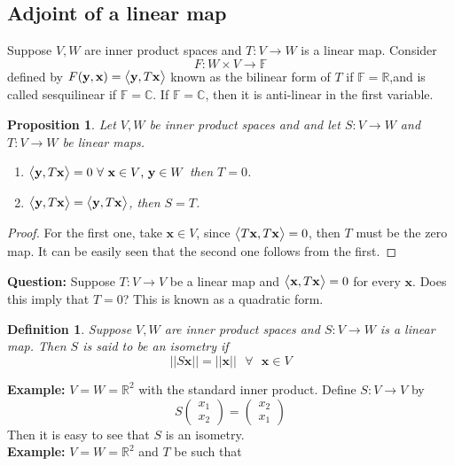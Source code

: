 \documentclass{article}
\newtheorem{definition}{Definition}
\newtheorem{proposition}{Proposition}
\begin{document}
\subsection*{Adjoint of a linear map}
Suppose $V,W$ are inner product spaces and $T:V\to W$ is a linear map. Consider 
$$F:W\times V\to \mathbb{F}$$
defined by $F(\mathbf{y},\mathbf{x})=\big{<}\mathbf{y},T\mathbf{x}\big{>}$ known as the bilinear form of  $T$ if $\mathbb{F}=\mathbb{R}$,and is called sesquilinear if $\mathbb{F}=\mathbb{C}$.
If $\mathbb{F}=\mathbb{C}$, then it is anti-linear in the first variable.
\begin{proposition}
    Let $V,W$ be inner product spaces and and let $S:V\to W$ and $T:V\to W$ be linear maps.
    \begin{enumerate}
        \item $\big{<}\mathbf{y},T\mathbf{x}\big{>}=0\text{ }\forall \text{ }\mathbf{x}\in V\text{, }\mathbf{y}\in W$ then $T=0$.
        \item $\big{<}\mathbf{y},T\mathbf{x}\big{>}=\big{<}\mathbf{y},T\mathbf{x}\big{>}$, then $S=T$.
    \end{enumerate}
\end{proposition}
    \begin{proof}
        For the first one, take $\mathbf{x}\in V$, since $\big{<}T\mathbf{x},T\mathbf{x}\big{>}=0$, then $T$ must be the zero map. It can be easily seen that the second one follows from the first.
    \end{proof}
\textbf{Question:} Suppose $T:V\to V$ be a linear map and $\big{<}\mathbf{x},T\mathbf{x}\big{>}=0$ for every $\mathbf{x}$. Does this imply that $T=0$? This is known as a quadratic form.
\\
\begin{definition}
    Suppose $V,W$ are inner product spaces and $S:V\to W$ is a linear map. Then $S$ is said to be an isometry if 
    $$||S\mathbf{x}||=||\mathbf{x}||\text{ }\forall \text{ }\mathbf{x}\in V$$
\end{definition}
\textbf{Example:} $V=W=\mathbb{R}^2$ with the standard inner product. Define $S:V\to V$ by 
$$S
\begin{pmatrix}
    x_1\\
    x_2
\end{pmatrix}
=
\begin{pmatrix}
    x_2\\
    x_1
\end{pmatrix}
$$
 Then it is easy to see that $S$ is an isometry.
 \\
 \textbf{Example:} $V=W=\mathbb{R}^2$ and $T$ be such that 
\end{document}
